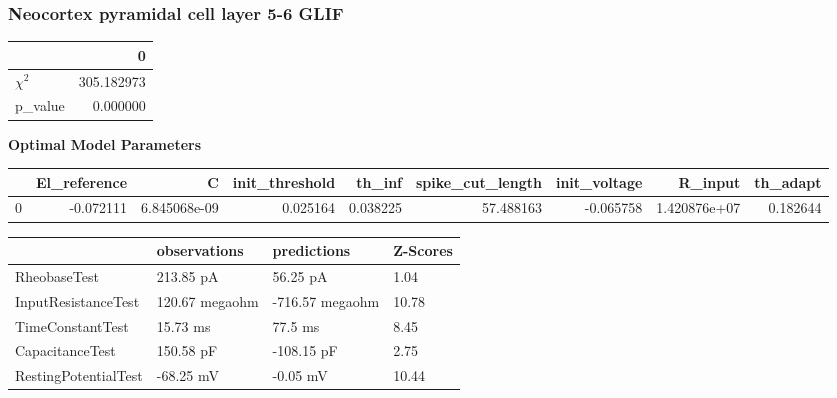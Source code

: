 \subsubsection{Neocortex pyramidal cell layer 5-6 GLIF}\begin{tabular}{lr}
\toprule
{} &           0 \\
\midrule
$\chi^{2}$ &  305.182973 \\
p\_value    &    0.000000 \\
\bottomrule
\end{tabular}
\textbf{Optimal Model Parameters} \begin{tabular}{lrrrrrrrr}
\toprule
{} &  El\_reference &             C &  init\_threshold &    th\_inf &  spike\_cut\_length &  init\_voltage &       R\_input &  th\_adapt \\
\midrule
0 &     -0.072111 &  6.845068e-09 &        0.025164 &  0.038225 &         57.488163 &     -0.065758 &  1.420876e+07 &  0.182644 \\
\bottomrule
\end{tabular}
\begin{tabular}{llll}
\toprule
{} &    observations &      predictions & Z-Scores \\
\midrule
RheobaseTest         &       213.85 pA &         56.25 pA &     1.04 \\
InputResistanceTest  &  120.67 megaohm &  -716.57 megaohm &    10.78 \\
TimeConstantTest     &        15.73 ms &          77.5 ms &     8.45 \\
CapacitanceTest      &       150.58 pF &       -108.15 pF &     2.75 \\
RestingPotentialTest &       -68.25 mV &         -0.05 mV &    10.44 \\
\bottomrule
\end{tabular}
